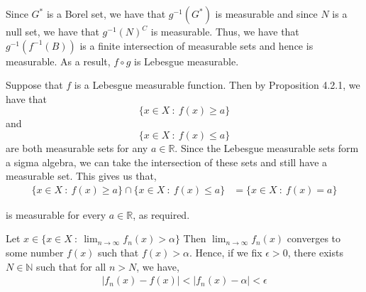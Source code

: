 \documentclass[12pt]{article}
\newenvironment{problem}[2][Problem]{\begin{trivlist}
\item[\hskip \labelsep {\bfseries #1}\hskip \labelsep {\bfseries #2.}]}{\end{trivlist}}
\begin{document}
Since $G^*$ is a Borel set, we have that $g^{-1}(G^*)$ is measurable and since $N$ is a null set, we have that $g^{-1}(N)^C$ is measurable. Thus, we have that $g^{-1}(f^{-1}(B))$ is a finite intersection of measurable sets and hence is measurable. As a result, $f \circ g$ is Lebesgue measurable.

\begin{problem}{9}
\end{problem}

Suppose that $f$ is a Lebesgue measurable function. Then by Proposition 4.2.1, we have that $$\{x \in X \ : \ f(x) \geq a\}$$ and $$\{x \in X \ : \ f(x) \leq a\}$$ are both measurable sets for any $a \in \mathbb{R}$. Since the Lebesgue measurable sets form a sigma algebra, we can take the intersection of these sets and still have a measurable set. This gives us that,
\begin{align*}
\{x \in X \ : \ f(x) \geq a\} \cap \{x \in X \ : \ f(x) \leq a\} &= \{x \in X \ : \ f(x) = a\}
\end{align*}

is measurable for every $a \in \mathbb{R}$, as required.

\begin{problem}{10}
\end{problem}

Let $x \in \{x \in X \ : \ \lim_{n \to \infty} f_n(x) > \alpha\}$ Then $\lim_{n \to \infty} f_n(x)$ converges to some number $f(x)$ such that $f(x) > \alpha$. Hence, if we fix $\epsilon > 0$, there exists $N \in \mathbb{N}$ such that for all $n > N$, we have,
\begin{align*}
|f_n(x) - f(x)| < |f_n(x) - \alpha| < \epsilon
\end{align*}
\end{document}
